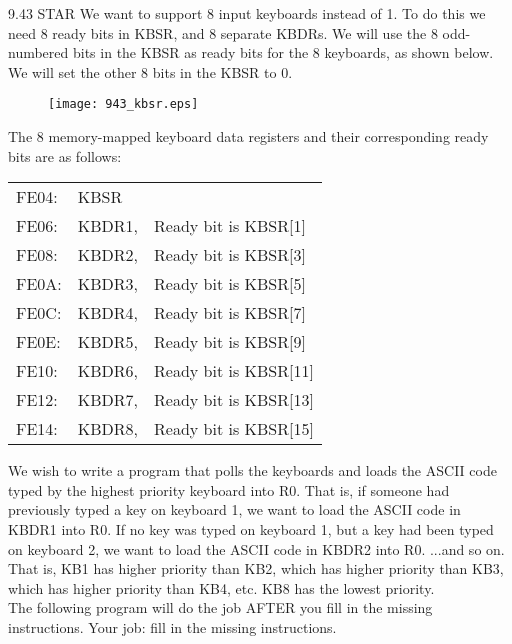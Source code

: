\documentclass{patt}
\begin{document}
\begin{exercises}
\item[9.43]STAR We want to support 8 input keyboards instead of 1.  To do this we need 8 ready bits in KBSR, and 8 separate KBDRs.  We will use the 8 odd-numbered bits in the KBSR as ready bits for the 8 keyboards, as shown below. We will set the other 8 bits in the KBSR to 0.\\

\begin{figure}[h]
\begin{center}
\texttt{[image: 943\_kbsr.eps]}
\end{center}
\end{figure}

\noindent
The 8 memory-mapped keyboard data registers and their corresponding ready bits
are as follows: \\

\begin{center}
\begin{tabular}{l l l} 
FE04: & KBSR   & \\  
FE06: & KBDR1, & Ready bit is KBSR[1]\\  
FE08: & KBDR2, & Ready bit is KBSR[3]\\  
FE0A: & KBDR3, & Ready bit is KBSR[5]\\  
FE0C: & KBDR4, & Ready bit is KBSR[7]\\  
FE0E: & KBDR5, & Ready bit is KBSR[9]\\  
FE10: & KBDR6, & Ready bit is KBSR[11]\\  
FE12: & KBDR7, & Ready bit is KBSR[13]\\  
FE14: & KBDR8, & Ready bit is KBSR[15]\\  
\end{tabular}
\end{center}

\noindent
We wish to write a program that polls the keyboards and loads the ASCII code
typed by the highest priority keyboard into R0.  That is, if someone had
previously typed a key on keyboard 1, we want to load the ASCII code in KBDR1
into R0.  If no key was typed on keyboard 1, but a key had been typed on
keyboard 2, we want to load the ASCII code in KBDR2 into R0.  ...and so on.
That is, KB1 has higher priority than KB2, which has higher priority than KB3,
which has higher priority than KB4, etc.  KB8 has the lowest priority. \\

\noindent
The following program will do the job AFTER you fill in the missing 
instructions. Your job: fill in the missing instructions.


\end{exercises}
\end{document}
